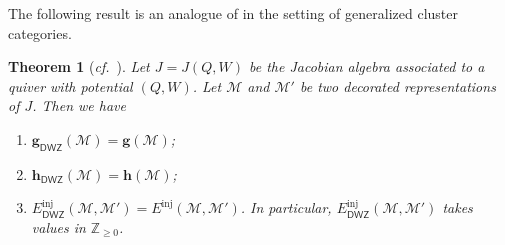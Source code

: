 \documentclass[12pt]{amsart}
\newtheorem{theorem}{Theorem}[section]
\theoremstyle{definition}
\theoremstyle{remark}
\numberwithin{equation}{section}
\newcommand{\confer}{\textit{cf.}\ }
\newcommand{\DWZ}{\mathsf{DWZ}}
\begin{document}
    The following result is an analogue of \cite[Proposition~4.8]{Plamondon-2011} in the setting of generalized cluster categories.
    \begin{theorem}[{\confer\cite[Proposition~4.8]{Plamondon-2011}}]\label{thm:g-DWZ}
       Let $J=J(Q,W)$ be the Jacobian algebra associated to a quiver with potential $(Q,W)$. Let $\mathcal M$ and $\mathcal M'$ be two decorated representations of $J$. Then we have \begin{enumerate}
\item[(i)]$\mathbf{g}_\DWZ(\mathcal{M})=\mathbf{g}(\mathcal{M})$;
            \item[(ii)]
            $\mathbf{h}_{\DWZ}(\mathcal{M})=\mathbf{h}(\mathcal{M})$;
            \item[(iii)]
$E^{\mathrm{inj}}_\DWZ(\mathcal{M}, \mathcal{M}')=E^{\mathrm{inj}}(\mathcal{M}, \mathcal{M}')$. In particular, $E^{\mathrm{inj}}_\DWZ(\mathcal{M}, \mathcal{M}')$ takes values in $\mathbb Z_{\geq 0}$. 
        \end{enumerate}
    \end{theorem}
\end{document}
